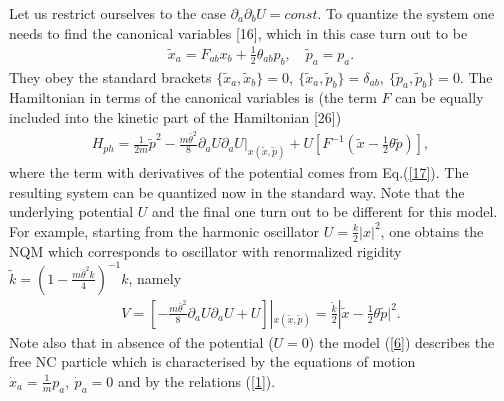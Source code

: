 \documentclass[paper a4]{article}
\begin{document}
Let us restrict ourselves to the case $\partial_a\partial_b U=const$.
To quantize the system
one needs to find the canonical variables [16], which in this case
turn out to be
\begin{eqnarray}\label{22}
\tilde x_a=F_{ab}x_b+\frac{1}{2}\theta_{ab}p_b, \quad
\tilde p_a=p_a.
\end{eqnarray}
They obey the standard brackets
$\{\tilde x_a, \tilde x_b\}=0, ~ \{\tilde x_a, \tilde p_b\}=\delta_{ab},
~ \{\tilde p_a, \tilde p_b\}=0$.
The Hamiltonian in terms of the canonical variables is
(the term $F$ can be equally included into the kinetic part
of the Hamiltonian [26])
\begin{eqnarray}\label{23}
H_{ph}=\frac{1}{2m}\tilde p^2-
\frac{m\bar\theta^2}{8}\partial_aU\partial_aU|_{x(\tilde x, \tilde p)}+
U[F^{-1}(\tilde x-\frac{1}{2}\theta\tilde p)],
\end{eqnarray}
where the term with derivatives of the potential comes from Eq.(\ref{17}).
The resulting system can be quantized now in the standard way. Note that
the underlying potential $U$ and the final one turn out to be different
for this model. For example, starting from the harmonic oscillator
$U=\frac{k}{2}|x|^2$, one obtains the NQM which corresponds to
oscillator with
renormalized rigidity $\tilde k=(1-\frac{m\bar\theta^2k}{4})^{-1}k$,
namely
\begin{eqnarray}\label{24}
V=
[-\frac{m\bar\theta^2}{8}\partial_aU\partial_aU+
U]|_{x(\tilde x, \tilde p)}=\frac{\tilde k}{2}
|\tilde x-\frac{1}{2}\theta\tilde p|^{2}.
\end{eqnarray}
Note also that in absence of the potential ($U=0$) the model (\ref{6})
describes the free NC particle which is characterised
by the equations of motion $\dot x_a=\frac{1}{m}p_a, ~ \dot p_a=0$
and by the relations (\ref{1}).
\end{document}
